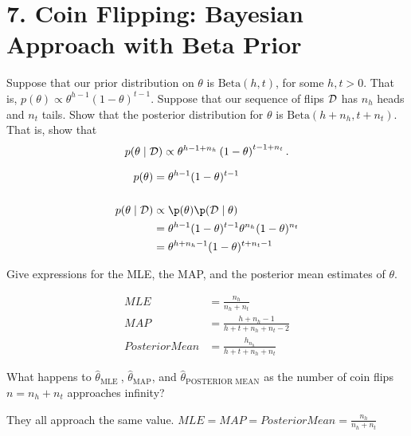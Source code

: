 \documentclass[12pt,letterpaper]{article}
\begin{document}
\section*{7. Coin Flipping: Bayesian Approach with Beta Prior}
\begin{problem}{7.1}
    Suppose that our prior distribution on $\theta$ is
    $\mbox{Beta}(h,t)$, for some $h,t>0$. That is, $p(\theta)\propto\theta^{h-1}\left(1-\theta\right)^{t-1}$.
    Suppose that our sequence of flips $\mathcal{D}$ has $n_{h}$ heads and $n_{t}$
    tails. Show that the posterior distribution for $\theta$ is $\mbox{Beta}(h+n_{h},t+n_{t})$.
    That is, show that
    \[
    p(\theta\mid\mathcal{D})\propto\theta^{h-1+n_{h}}\left(1-\theta\right)^{t-1+n_{t}}.
    \]
\end{problem}
\begin{solution}{}
    \begin{align*}
        p(\theta) &= \theta^{h-1}(1-\theta)^{t-1}\\
        \\
        p(\theta\mid\cd) &\propto \p(\theta)\p(\cd\mid\theta)\\
        &= \theta^{h-1}(1-\theta)^{t-1}\theta^{n_h}(1-\theta)^{n_t}\\
        &= \theta^{h+n_h-1}(1-\theta)^{t+n_t-1}
    \end{align*}
\end{solution}
\newpage

\begin{problem}{7.2}
    Give expressions for the MLE, the MAP, and the posterior mean estimates of $\theta$.
\end{problem}
\begin{solution}{}
    \begin{align*}
        MLE &= \frac{n_h}{n_h+n_t}\\
        MAP &= \frac{h+n_h-1}{h+t+n_h+n_t-2}\\
        Posterior Mean &= \frac{h_n_h}{h+t+n_h+n_t} 
    \end{align*}
\end{solution}
\newpage

\begin{problem}{7.3}
    What happens to $\hat{\theta}_{\text{MLE }}$, $\hat{\theta}_{\text{MAP}}$,
    and $\hat{\theta}_{\text{POSTERIOR MEAN}}$ as the number of coin
    flips $n=n_{h}+n_{t}$ approaches infinity?
\end{problem}
\begin{solution}{}
    They all approach the same value. $MLE = MAP = Posterior Mean = \frac{n_h}{n_h+n_t}$
\end{solution}
\newpage
\end{document}
